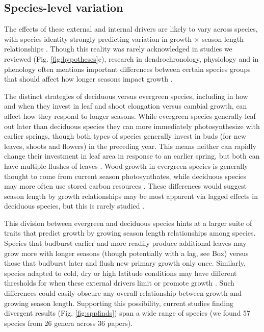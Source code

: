 \documentclass[11pt]{article}
\begin{document}
\subsection*{Species-level variation}
The effects of these external and internal drivers are likely to vary across species, with species identity strongly predicting variation in growth $\times$ season length relationships \citep[e.g.][]{cuny2012life,michelot2012comparing}. Though this reality was rarely acknowledged in studies we reviewed (Fig. \ref{fig:hypotheses}c), research in dendrochronology, physiology and in phenology often mentions important differences between certain species groups that should affect how longer seasons impact growth \citep{camarero2015or,fu2019nutrient,puchalka2024tree}. 

The distinct strategies of deciduous versus evergreen species, including in how and when they invest in leaf and shoot elongation versus cambial growth, can affect how they respond to longer seasons. While evergreen species generally leaf out later than deciduous species they can more immediately photosynthesize with earlier springs, though both types of species generally invest in buds (for new leaves, shoots and flowers) in the preceding year. This means neither can rapidly change their investment in leaf area in response to an earlier spring, but both can have multiple flushes of leaves \citep{day2011regulation,soolanayakanahally2013timing}. Wood growth in evergreen species is generally thought to come from current season photosynthates, while deciduous species may more often use stored carbon resources \citep{gordon1968seasonal,monson2018finding}. These differences would suggest season length by growth relationships
may be most apparent via lagged effects in deciduous species, but this is rarely studied  \citep[and not clearly supported to date, see][]{coulthard2020limits,klesse2023legacy}. %

This division between evergreen and deciduous species hints at a larger suite of traits that predict growth by growing season length relationships among species. Species that budburst earlier and more readily produce additional leaves \citep[e.g. leaf flushes after budset, and other characteristics more common to `indeterminate' species,][]{kikuzawa1982leaf,Lechowicz:1984cr} may grow more with longer seasons (though potentially with a lag, see Box) versus those that budburst later and flush new primary growth only once. Similarly, species adapted to cold, dry or high latitude conditions may have different thresholds for when these external drivers limit or promote growth \citep[e.g. some \emph{Populus} and \emph{Quercus} species,][and see Fig.\ref{fig:moraconcept}]{soolanayakanahally2013timing,mckown2016impacts,delpierre2017tree,de2022temperature}. Such differences could easily obscure any overall relationship between growth and growing season length. Supporting this possibility, current studies finding divergent results (Fig. \ref{fig:sppfinds}) span a wide range of species (we found  57 species from 26 genera across 36 papers). 
\end{document}
